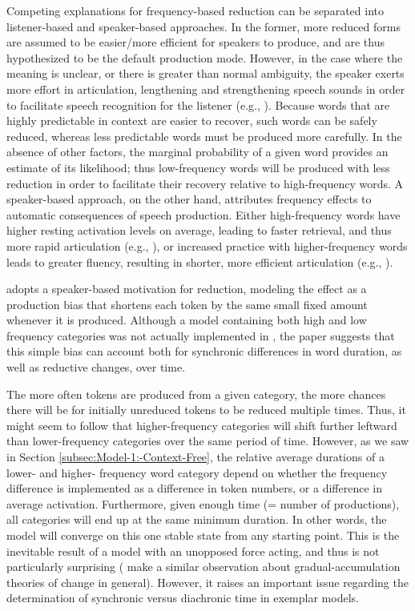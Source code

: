 Competing explanations for frequency-based reduction can be separated
into listener-based and speaker-based approaches. In the former, more
reduced forms are assumed to be easier/more efficient for speakers
to produce, and are thus hypothesized to be the default production
mode. However, in the case where the meaning is unclear, or there
is greater than normal ambiguity, the speaker exerts more effort in
articulation, lengthening and strengthening speech sounds in order
to facilitate speech recognition for the listener (e.g., \citealp{Aylett2004}).
Because words that are highly predictable in context are easier to
recover, such words can be safely reduced, whereas less predictable
words must be produced more carefully. In the absence of other factors,
the marginal probability of a given word provides an estimate of its
likelihood; thus low-frequency words will be produced with less reduction
in order to facilitate their recovery relative to high-frequency words.
A speaker-based approach, on the other hand, attributes frequency
effects to automatic consequences of speech production. Either high-frequency
words have higher resting activation levels on average, leading to
faster retrieval, and thus more rapid articulation (e.g., \citealt{gahl2012reduce}),
or increased practice with higher-frequency words leads to greater
fluency, resulting in shorter, more efficient articulation (e.g.,
\citealt{Bybee2002}).

\citet{Pierrehumbert2000} adopts a speaker-based motivation for reduction,
modeling the effect as a production bias that shortens each token
by the same small fixed amount whenever it is produced. Although a
model containing both high and low frequency categories was not actually
implemented in \citet{Pierrehumbert2000}, the paper suggests that
this simple bias can account both for synchronic differences in word
duration, as well as reductive changes, over time. 

The more often tokens are produced from a given category, the more
chances there will be for initially unreduced tokens to be reduced
multiple times. Thus, it might seem to follow that higher-frequency
categories will shift further leftward than lower-frequency categories
over the same period of time. However, as we saw in Section \ref{subsec:Model-1:-Context-Free},
the relative average durations of a lower- and higher- frequency word
category depend on whether the frequency difference is implemented as a difference in token numbers, or a difference in average activation. Furthermore, given
enough time (= number of productions), all categories will end up
at the same minimum duration. In other words, the model will converge
on this one stable state from any starting point. This is the inevitable
result of a model with an unopposed force acting, and thus is not
particularly surprising (\citealt{Baker2011} make a similar observation
about gradual-accumulation theories of change in general). However,
it raises an important issue regarding the determination of synchronic
versus diachronic time in exemplar models. 

